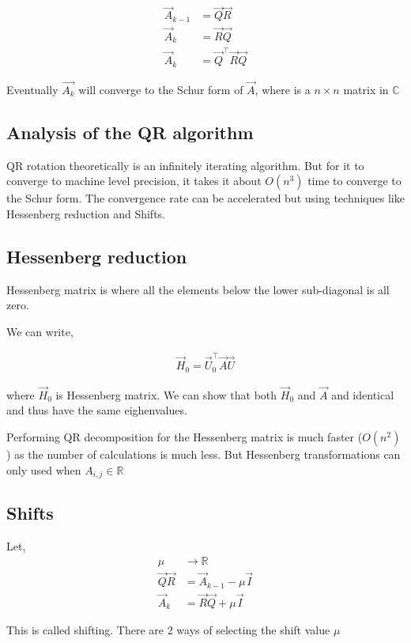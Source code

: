 \documentclass[journal]{IEEEtran}
\numberwithin{equation}{section}
\begin{document}
\begin{align}
    \vec{A}_{k-1} &= \vec{Q}\vec{R}\\
    \vec{A}_k &= \vec{R}\vec{Q}\\
    \vec{A}_k &= \vec{Q}^\top\vec{R}\vec{Q}
\end{align}


Eventually $\vec{A_k}$ will converge to the Schur form of $\vec{A}$, where is a $n \times n$ matrix in $\mathbb{C}$ 

\subsection{Analysis of the QR algorithm}

QR rotation theoretically is an infinitely iterating algorithm. But for it to converge to machine level precision, it takes it about $O(n^3)$ time to converge to the Schur form. The convergence rate can be accelerated but using techniques like Hessenberg reduction and Shifts.

\subsection{Hessenberg reduction}

Hessenberg matrix is where all the elements below the lower sub-diagonal is all zero.

We can write, 

\begin{align}
    \vec{H}_0 = \vec{U}^\top_0\vec{A}\vec{U}
\end{align}

where $\vec{H}_0$ is Hessenberg matrix. We can show that both $\vec{H}_0$ and $\vec{A}$ and identical and thus have the same eighenvalues. 

Performing QR decomposition for the Hessenberg matrix is much faster ($O(n^2)$) as the number of calculations is much less. 
But Hessenberg transformations can only used when $A_{i,j} \in \mathbb{R}$
\subsection{Shifts}
Let,
\begin{align}
    \mu &\to \mathbb{R}\\
    \vec{Q}\vec{R} &= \vec{A}_{k-1} - \mu\vec{I}\\
    \vec{A}_k &= \vec{R}\vec{Q} + \mu\vec{I}
\end{align}

This is called shifting. There are 2 ways of selecting the shift value $\mu$
\end{document}
